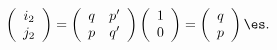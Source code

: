 \begin{equation}
\left(
 \begin{array}{c}
   {i_2}\\
   {j_2}
 \end{array}
\right)
=
\left(
 \begin{array}{cc}
   {q} & {p^\prime} \\
   {p} & {q^\prime} 
 \end{array}
\right)
\left(
 \begin{array}{c}
   1 \\
   0
 \end{array}
\right) 
=
\left(
 \begin{array}{c}
   q \\
   p
 \end{array}
\right) \es.
\label{eq:DhnTwst}
\end{equation}


